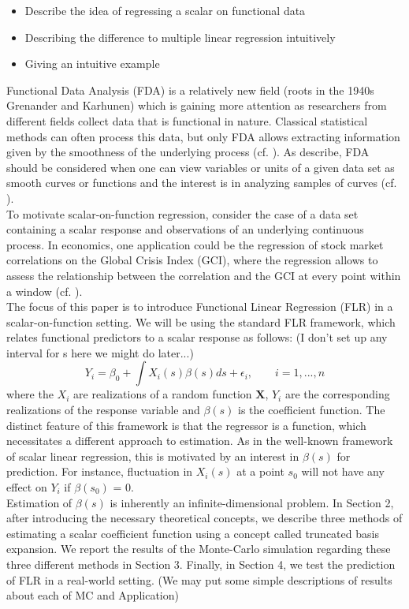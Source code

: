 \documentclass[11pt,twoside,a4paper]{article}
\begin{document}
	\begin{itemize}
		\item Describe the idea of regressing a scalar on functional data
		\item Describing the difference to multiple linear regression intuitively
		\item Giving an intuitive example
	\end{itemize}	
	Functional Data Analysis (FDA) is a relatively new field {\color{red} (roots in the 1940s Grenander and Karhunen)} which is gaining more attention as researchers from different fields collect data that is functional in nature. Classical statistical methods can often process this data, but only FDA allows extracting information given by the smoothness of the underlying process (cf. \cite{levitin_introduction_2007}).
	 As \cite{kokoszka_introduction_2017} describe, FDA should be considered when one can view variables or units of a given data set as smooth curves or functions and the interest is in analyzing samples of curves (cf. \cite[S.~17]{kokoszka_introduction_2017}).\\
	 To motivate scalar-on-function regression, consider the case of a data set containing a scalar response and observations of an underlying continuous process. In economics, one application could be the regression of stock market correlations on the Global Crisis Index (GCI), where the regression allows to assess the relationship between the correlation and the GCI at every point within a window (cf. \cite{Das_2019}).\\
	 The focus of this paper is to introduce Functional Linear Regression (FLR) in a scalar-on-function setting. We will be using the standard FLR framework, which relates functional predictors to a scalar response as follows:  {\color{red} (I don't set up any interval for s here we might do later...)}
	 \begin{equation}
	 	Y_{i} = \beta_{0} + \int{X_{i}(s)\beta(s)ds} + \epsilon_{i},
	 	\qquad i = 1, ..., n
	 \end{equation}
	 where the $X_{i}$ are realizations of a random function $\mathbf{X}$, $Y_i$ are the corresponding realizations of the response variable and $\beta(s)$ is the coefficient function. The distinct feature of this framework is that the regressor is a function, which necessitates a different approach to estimation. As in the well-known framework of scalar linear regression, this is motivated by an interest in $\beta(s)$ for prediction. For instance, fluctuation in $X_i(s)$ at a point $s_0$ will not have any effect on $Y_i$ if $\beta(s_0)$ = 0. \\
	 Estimation of $\beta(s)$ is inherently an infinite-dimensional problem. In Section 2, after introducing the necessary theoretical concepts, we describe three methods of estimating a scalar coefficient function using a concept called truncated basis expansion. We report the results of the Monte-Carlo simulation regarding these three different methods in Section 3. Finally, in Section 4, we test the prediction of FLR in a real-world setting. {\color{red} (We may put some simple descriptions of results about each of MC and Application)}
\end{document}
